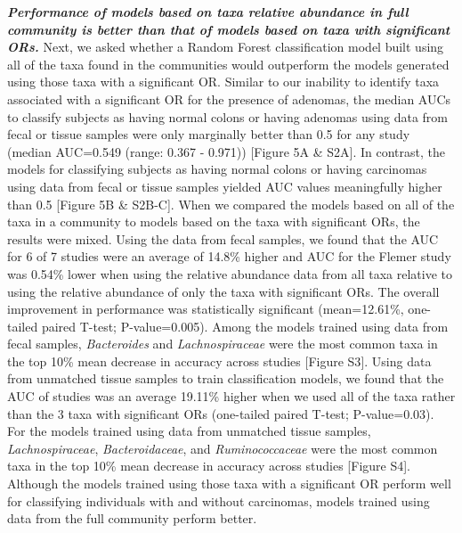 \documentclass[12pt,]{article}
\begin{document}
\textbf{\emph{Performance of models based on taxa relative abundance in
full community is better than that of models based on taxa with
significant ORs.}} Next, we asked whether a Random Forest classification
model built using all of the taxa found in the communities would
outperform the models generated using those taxa with a significant OR.
Similar to our inability to identify taxa associated with a significant
OR for the presence of adenomas, the median AUCs to classify subjects as
having normal colons or having adenomas using data from fecal or tissue
samples were only marginally better than 0.5 for any study (median
AUC=0.549 (range: 0.367 - 0.971)) {[}Figure 5A \& S2A{]}. In contrast,
the models for classifying subjects as having normal colons or having
carcinomas using data from fecal or tissue samples yielded AUC values
meaningfully higher than 0.5 {[}Figure 5B \& S2B-C{]}. When we compared
the models based on all of the taxa in a community to models based on
the taxa with significant ORs, the results were mixed. Using the data
from fecal samples, we found that the AUC for 6 of 7 studies were an
average of 14.8\% higher and AUC for the Flemer study was 0.54\% lower
when using the relative abundance data from all taxa relative to using
the relative abundance of only the taxa with significant ORs. The
overall improvement in performance was statistically significant
(mean=12.61\%, one-tailed paired T-test; P-value=0.005). Among the
models trained using data from fecal samples, \emph{Bacteroides} and
\emph{Lachnospiraceae} were the most common taxa in the top 10\% mean
decrease in accuracy across studies {[}Figure S3{]}. Using data from
unmatched tissue samples to train classification models, we found that
the AUC of studies was an average 19.11\% higher when we used all of the
taxa rather than the 3 taxa with significant ORs (one-tailed paired
T-test; P-value=0.03). For the models trained using data from unmatched
tissue samples, \emph{Lachnospiraceae}, \emph{Bacteroidaceae}, and
\emph{Ruminococcaceae} were the most common taxa in the top 10\% mean
decrease in accuracy across studies {[}Figure S4{]}. Although the models
trained using those taxa with a significant OR perform well for
classifying individuals with and without carcinomas, models trained
using data from the full community perform better.
\end{document}
